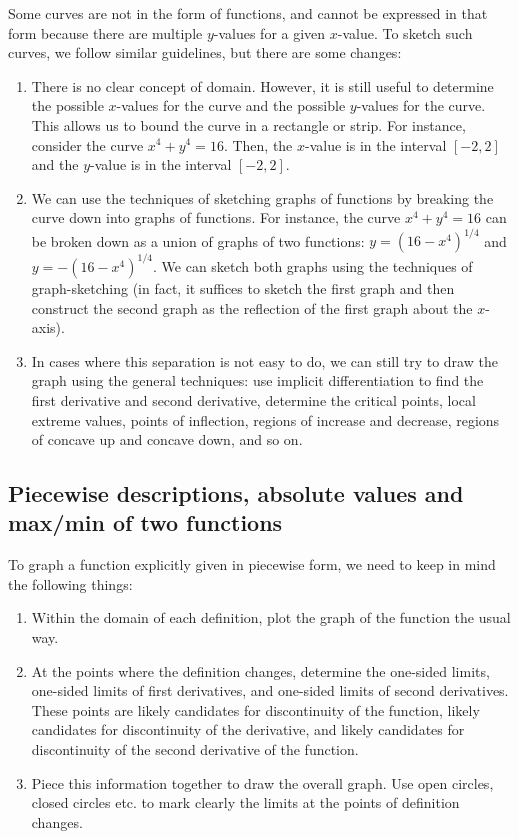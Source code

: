 \documentclass[10pt]{amsart}
\begin{document}
Some curves are not in the form of functions, and cannot be expressed
in that form because there are multiple $y$-values for a given
$x$-value. To sketch such curves, we follow similar guidelines, but
there are some changes:

\begin{enumerate}
\item There is no clear concept of domain. However, it is still useful
  to determine the possible $x$-values for the curve and the possible
  $y$-values for the curve. This allows us to bound the curve in a
  rectangle or strip. For instance, consider the curve $x^4 + y^4 =
  16$. Then, the $x$-value is in the interval $[-2,2]$ and the
  $y$-value is in the interval $[-2,2]$.
\item We can use the techniques of sketching graphs of functions by
  breaking the curve down into graphs of functions. For instance, the
  curve $x^4 + y^4 = 16$ can be broken down as a union of graphs of
  two functions: $y = (16 - x^4)^{1/4}$ and $y = -(16 -
  x^4)^{1/4}$. We can sketch both graphs using the techniques of
  graph-sketching (in fact, it suffices to sketch the first graph and
  then construct the second graph as the reflection of the first graph
  about the $x$-axis).
\item In cases where this separation is not easy to do, we can still
  try to draw the graph using the general techniques: use implicit
  differentiation to find the first derivative and second derivative,
  determine the critical points, local extreme values, points of
  inflection, regions of increase and decrease, regions of concave up
  and concave down, and so on.
\end{enumerate}

\subsection{Piecewise descriptions, absolute values and max/min of two functions}

To graph a function explicitly given in piecewise form, we need to
keep in mind the following things:

\begin{enumerate}
\item Within the domain of each definition, plot the graph of the
  function the usual way.
\item At the points where the definition changes, determine the
  one-sided limits, one-sided limits of first derivatives, and
  one-sided limits of second derivatives. These points are likely
  candidates for discontinuity of the function, likely candidates for
  discontinuity of the derivative, and likely candidates for
  discontinuity of the second derivative of the function.
\item Piece this information together to draw the overall graph. Use
  open circles, closed circles etc. to mark clearly the limits at the
  points of definition changes.
\end{enumerate}
\end{document}
